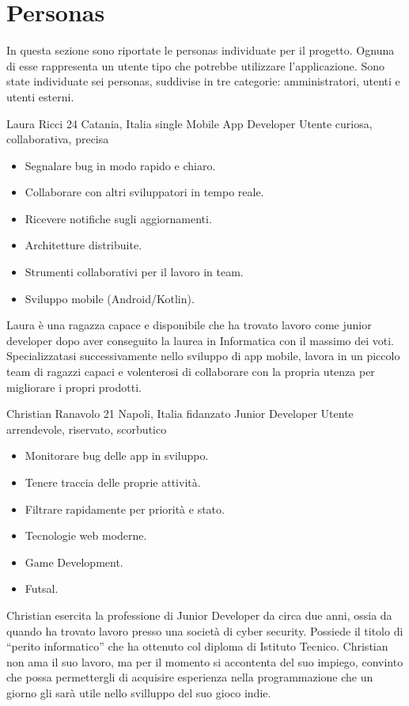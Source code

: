 \section{Personas}\label{Personas}
In questa sezione sono riportate le personas individuate per il progetto.
Ognuna di esse rappresenta un utente tipo che potrebbe utilizzare l'applicazione.
Sono state individuate sei personas, suddivise in tre categorie: amministratori, utenti e utenti esterni.

\begin{personaenv}
  {Laura Ricci}
  {24}
  {Catania, Italia}
  {single}
  {Mobile App Developer}
  {Utente}
  {curiosa, collaborativa, precisa}
  {\begin{itemize}
    \item Segnalare bug in modo rapido e chiaro.
    \item Collaborare con altri sviluppatori in tempo reale.
    \item Ricevere notifiche sugli aggiornamenti.
  \end{itemize}}
  {\begin{itemize}
    \item Architetture distribuite.
    \item Strumenti collaborativi per il lavoro in team.
    \item Sviluppo mobile (Android/Kotlin).
  \end{itemize}}
  {Laura è una ragazza capace e disponibile che ha trovato lavoro come junior developer dopo aver conseguito
  la laurea in Informatica con il massimo dei voti. Specializzatasi successivamente nello sviluppo di app mobile,
  lavora in un piccolo team di ragazzi capaci e volenterosi di collaborare con la propria utenza per migliorare
  i propri prodotti.}
\end{personaenv}

\begin{personaenv}
  {Christian Ranavolo}
  {21}
  {Napoli, Italia}
  {fidanzato}
  {Junior Developer}
  {Utente}
  {arrendevole, riservato, scorbutico}
  {\begin{itemize}
    \item Monitorare bug delle app in sviluppo.
    \item Tenere traccia delle proprie attività.
    \item Filtrare rapidamente per priorità e stato.
  \end{itemize}}
  {\begin{itemize}
    \item Tecnologie web moderne.
    \item Game Development.
    \item Futsal.
  \end{itemize}}
  {Christian esercita la professione di Junior Developer da circa due anni, ossia da quando ha trovato lavoro presso 
  una società di cyber security. Possiede il titolo di “perito informatico” che ha ottenuto col diploma di Istituto Tecnico. 
  Christian non ama il suo lavoro, ma per il momento si accontenta del suo impiego, convinto che possa permettergli di 
  acquisire esperienza nella programmazione che un giorno gli sarà utile nello svilluppo del suo gioco indie.}
\end{personaenv}

